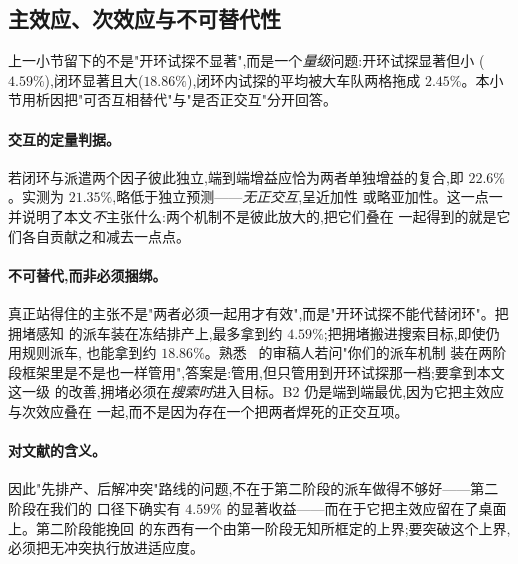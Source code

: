 \documentclass[manuscript,screen,review]{acmart}
\newcommand{\GainLoopRule}{18.86\%}      %
\newcommand{\GainProbeOpen}{4.59\%}      %
\newcommand{\GainProbeLoop}{2.45\%}      %
\newcommand{\GainEndToEnd}{21.35\%}      %
\newcommand{\GainIndepProduct}{22.6\%}
\begin{document}
\subsection{主效应、次效应与不可替代性}
\label{sec:complement}

上一小节留下的不是"开环试探不显著",而是一个\emph{量级}问题:开环试探显著但小
($\GainProbeOpen$),闭环显著且大($\GainLoopRule$),闭环内试探的平均被大车队两格拖成
$\GainProbeLoop$。本小节用析因把"可否互相替代"与"是否正交互"分开回答。

\paragraph{交互的定量判据。}
若闭环与派遣两个因子彼此独立,端到端增益应恰为两者单独增益的复合,即
$\GainIndepProduct$。实测为 $\GainEndToEnd$,略低于独立预测——\emph{无正交互},呈近加性
或略亚加性。这一点一并说明了本文\emph{不}主张什么:两个机制不是彼此放大的,把它们叠在
一起得到的就是它们各自贡献之和减去一点点。

\paragraph{不可替代,而非必须捆绑。}
真正站得住的主张不是"两者必须一起用才有效",而是"开环试探不能代替闭环"。把拥堵感知
的派车装在冻结排产上,最多拿到约 $\GainProbeOpen$;把拥堵搬进搜索目标,即使仍用规则派车,
也能拿到约 $\GainLoopRule$。熟悉~\cite{sun2023integrated} 的审稿人若问"你们的派车机制
装在两阶段框架里是不是也一样管用",答案是:管用,但只管用到开环试探那一档;要拿到本文这一级
的改善,拥堵必须在\emph{搜索时}进入目标。B2 仍是端到端最优,因为它把主效应与次效应叠在
一起,而不是因为存在一个把两者焊死的正交互项。

\paragraph{对文献的含义。}
因此"先排产、后解冲突"路线的问题,不在于第二阶段的派车做得不够好——第二阶段在我们的
口径下确实有 $\GainProbeOpen$ 的显著收益——而在于它把主效应留在了桌面上。第二阶段能挽回
的东西有一个由第一阶段无知所框定的上界;要突破这个上界,必须把无冲突执行放进适应度。


\end{document}
